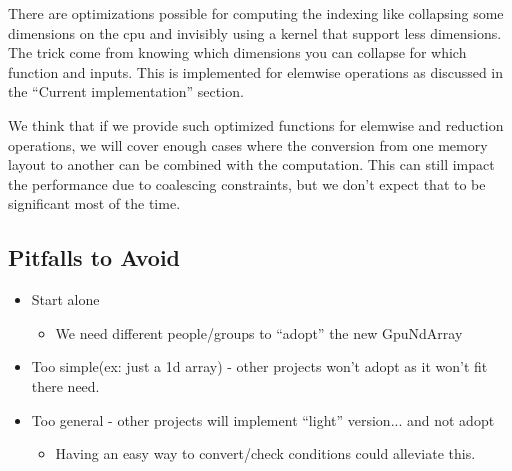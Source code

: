 \documentclass{article} %
\begin{document}
There are optimizations possible for computing the indexing like
collapsing some dimensions on the cpu and invisibly using a kernel
that support less dimensions. The trick come from knowing which 
dimensions you can collapse for which function and inputs. This is
implemented for elemwise operations as discussed in the ``Current
implementation'' section.

We think that if we provide such optimized functions for elemwise and
reduction operations, we will cover enough cases where the conversion from
one memory layout to another can be combined with the computation. This
can still impact the performance due to coalescing constraints, but we
don't expect that to be significant most of the time.

\subsection{Pitfalls to Avoid}
\begin{itemize}
\item Start alone
  \begin{itemize}
  \item We need different people/groups to ``adopt'' the new GpuNdArray
  \end{itemize}
\item Too simple(ex: just a 1d array) - other projects won't adopt as it won't fit there need.
\item Too general - other projects will implement ``light'' version... and not adopt
  \begin{itemize}
  \item Having an easy way to convert/check conditions could alleviate this.
  \end{itemize}
\end{itemize}
\end{document}
